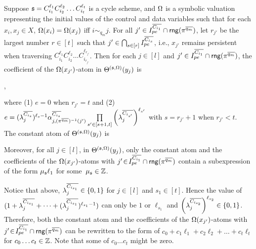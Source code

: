 \begin{lemma}\label{prop-cycle-schm}
Suppose ${\mathfrak{s} }=C_{i_1}^{\ell_1} C_{i_2}^{\ell_2} \dots C_{i_t}^{\ell_t}$ is a cycle scheme, and $\Omega$ is a symbolic valuation representing the initial values of the control and data variables such that for each $x_i, x_j \in X$, $\Omega(x_i) = \Omega(x_j)$ iff $i \sim_{q_m} j$. 
For all $j' \in  I^{\overline{C_{i_{1}}}}_{pe} \cap \mathsf{rng}(\pi^{\overline{q_m}})$, let $r_{j'}$ be the largest number $r \in [t]$ such that $j'\in\bigcap_{s\in[r]} I^{\overline{C_{i_{s}}}}_{pe}$, i.e., $x_{j'}$ remains persistent when traversing $C_{i_1}^{\ell_1} C_{i_2}^{\ell_2} \dots C_{i_{r_{j'}}}^{\ell_{r_{j'}}}$.
Then for each $j\in [l]$ and $j' \in I^{\overline{C_{i_1}}}_{pe}  \cap \mathsf{rng}(\pi^{\overline{q_m}})$, the coefficient of the $\Omega(x_{j'})$-atom in $\Theta^{({\mathfrak{s} },\Omega)}(y_j)$ is 
\begin{center}
,
\end{center}
where (1) $e\!=\!0$ when $r_{j'}\!=\!t$ and (2) $e=(\lambda^{\overline{C_{i_s}}}_{j})^{\ell_s-1} \alpha^{\overline{C_{i_{s}}}}_{j, (\pi^{\overline{q_m}})^{-1}(j')} \prod\limits_{{s'}\in[s+1,t]}\left(\lambda^{\overline{C_{i_{s'}}}}_{j}\right)^{\ell_{s'}}$ with $s=r_{j'}+1$ when $r_{j'}<t$.\\
The constant atom of $\Theta^{({\mathfrak{s} },\Omega)}(y_j)$ is 
\begin{center}
\end{center}
Moreover, for all $j\!\in\! [l]$, in $\Theta^{({\mathfrak{s} },\Omega)}(y_j)$, only the constant atom and the coefficients of the $\Omega(x_{j'})$-atoms with $j' \!\in\! I^{\overline{C_{i_1}}}_{pe} \cap \mathsf{rng}(\pi^{\overline{q_m}})$ contain a subexpression of the form $ \mu_{\mathfrak{s} } \ell_1$ for some~$\mu_{\mathfrak{s} }\in {\mathbb{Z} }$.
\end{lemma}
Notice that above, $\lambda^{\overline{C_{i_{s_1}}}}_j\in\{0,1\}$ for $j\in[l]$ and $s_1\in [t]$. Hence the value of $(1+\lambda^{\overline{C_{i_{s_1}}}}_{j} + \dots + (\lambda^{\overline{C_{i_{s_1}}}}_{j})^{\ell_{s_1}-1} )$ can only be $1$ or $\ell_{s_1}$ and $\left(\lambda^{\overline{C_{i_{s_2}}}}_{j}\right)^{\ell_{s_2}}\in\{0,1\}$.
Therefore, both the constant atom and the coefficients of the $\Omega(x_{j'})$-atoms with $j' \!\in\! I^{\overline{C_{i_1}}}_{pe} \cap \mathsf{rng}(\pi^{\overline{q_m}})$ can be rewritten to the form of $c_0+c_1\ell_1+c_2\ell_2+\dots+c_t\ell_t$ for $c_0\ldots c_t\in {\mathbb{Z} }$. Note that some of $c_0\ldots c_t$ might be zero.




